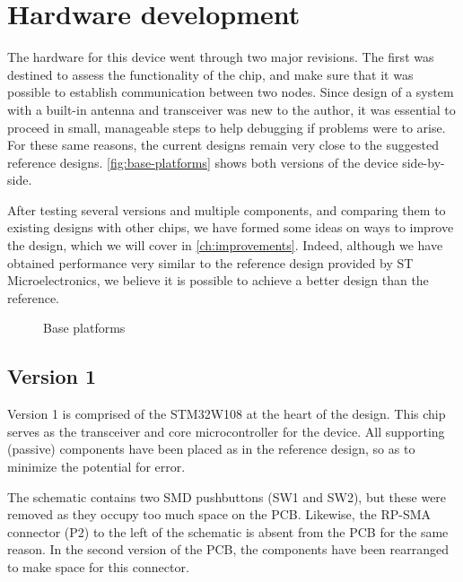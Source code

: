 \chapter{Hardware development}\label{ch:examples}

The hardware for this device went through two major revisions. The first was
destined to assess the functionality of the chip, and make sure that it was
possible to establish communication between two nodes. Since design of a system
with a built-in antenna and transceiver was new to the author, it was essential
to proceed in small, manageable steps to help debugging if problems were to
arise. For these same reasons, the current designs remain very close to the
suggested reference designs. \autoref{fig:base-platforms} shows both versions of
the device side-by-side.

After testing several versions and multiple components, and comparing them to
existing designs with other chips, we have formed some ideas on ways to improve
the design, which we will cover in \autoref{ch:improvements}.
Indeed, although we have obtained performance very similar to the reference
design provided by ST Microelectronics, we believe it is possible to achieve
a better design than the reference.

\begin{figure}[bth]
  \myfloatalign
  \caption{Base platforms}
  \label{fig:base-platforms}
\end{figure}


\section{Version 1}

Version 1 is comprised of the STM32W108 at the heart of the design. This chip
serves as the transceiver and core microcontroller for the device. All
supporting (passive) components have been placed as in the reference design, so
as to minimize the potential for error. 

The schematic contains two SMD pushbuttons (SW1 and SW2), but these were removed
as they occupy too much space on the PCB. Likewise, the RP-SMA connector (P2) to
the left of the schematic is absent from the PCB for the same reason. In the
second version of the PCB, the components have been rearranged to make space for
this connector.

